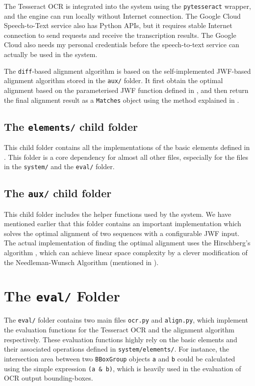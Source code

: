 The Tesseract OCR is integrated into the system using the \texttt{pytesseract} wrapper, and the engine can run locally without Internet connection. The Google Cloud Speech-to-Text service also has Python APIs, but it requires stable Internet connection to send requests and receive the transcription results. The Google Cloud also needs my personal credentials before the speech-to-text service can actually be used in the system.

The \texttt{diff}-based alignment algorithm is based on the self-implemented JWF-based alignment algorithm stored in the \texttt{aux/} folder. It first obtain the optimal alignment based on the parameterised JWF function defined in , and then return the final alignment result as a \texttt{Matches} object using the method explained in .

\subsection{The \texttt{elements/} child folder}

This child folder contains all the implementations of the basic elements defined in . This folder is a core dependency for almost all other files, especially for the files in the \texttt{system/} and the \texttt{eval/} folder.

\subsection{The \texttt{aux/} child folder}

This child folder includes the helper functions used by the system. We have mentioned earlier that this folder contains an important implementation which solves the optimal alignment of two sequences with a configurable JWF input. The actual implementation of finding the optimal alignment uses the Hirschberg's algorithm \cite{hirschberg1975linear}, which can achieve linear space complexity by a clever modification of the Needleman-Wunsch Algorithm (mentioned in ).


\section{The \texttt{eval/} Folder}

The \texttt{eval/} folder contains two main files \texttt{ocr.py} and \texttt{align.py}, which implement the evaluation functions for the Tesseract OCR and the alignment algorithm respectively. These evaluation functions highly rely on the basic elements and their associated operations defined in \texttt{system/elements/}. For instance, the intersection area between two \texttt{BBoxGroup} objects \texttt{a} and \texttt{b} could be calculated using the simple expression \texttt{(a \& b)}, which is heavily used in the evaluation of OCR output bounding-boxes.


